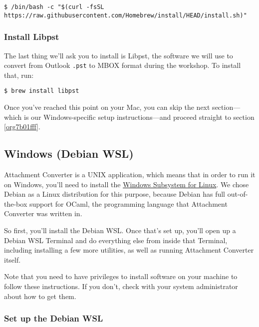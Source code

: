 \documentclass[11pt]{article}
\begin{document}
\begin{verbatim}
$ /bin/bash -c "$(curl -fsSL https://raw.githubusercontent.com/Homebrew/install/HEAD/install.sh)"
\end{verbatim}

\normalsize

\subsubsection{Install Libpst}
\label{sec:org4e25041}

The last thing we'll ask you to install is Libpst, the software we
will use to convert from Outlook \texttt{.pst} to MBOX format during the
workshop.  To install that, run:

\begin{verbatim}
$ brew install libpst
\end{verbatim}

Once you've reached this point on your Mac, you can skip the next
section---which is our Windows-specific setup instructions---and
proceed straight to section \ref{org7b01fff}.

\subsection{Windows (Debian WSL) \label{org09034e1}}
\label{sec:org8565965}

Attachment Converter is a UNIX application, which means that in order
to run it on Windows, you'll need to install the \href{https://en.wikipedia.org/wiki/Windows\_Subsystem\_for\_Linux}{Windows Subsystem for
Linux}.  We chose Debian as a Linux distribution for this purpose,
because Debian has full out-of-the-box support for OCaml, the
programming language that Attachment Converter was written in.

So first, you'll install the Debian WSL.  Once that's set up, you'll
open up a Debian WSL Terminal and do everything else from inside that
Terminal, including installing a few more utilities, as well as
running Attachment Converter itself.

Note that you need to have privileges to install software on your
machine to follow these instructions.  If you don't, check with your
system administrator about how to get them.

\subsubsection{Set up the Debian WSL}
\label{sec:org35b36b5}
\end{document}
